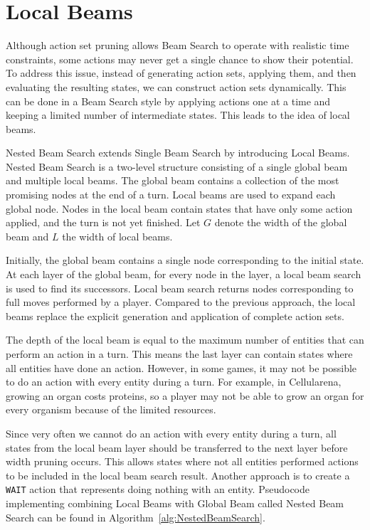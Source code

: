 \documentclass[shortabstract, mgr, english]{iithesis}
\begin{document}
\section{Local Beams}
\label{sec:LocalBeams}
Although action set pruning allows Beam Search to operate with realistic time constraints, some actions may never get a single chance to show their potential. To address this issue, instead of generating action sets, applying them, and then evaluating the resulting states, we can construct action sets dynamically. This can be done in a Beam Search style by applying actions one at a time and keeping a limited number of intermediate states. This leads to the idea of local beams.

Nested Beam Search extends Single Beam Search by introducing Local Beams. Nested Beam Search is a two-level structure consisting of a single global beam and multiple local beams. The global beam contains a collection of the most promising nodes at the end of a turn. Local beams are used to expand each global node. Nodes in the local beam contain states that have only some action applied, and the turn is not yet finished. Let $G$ denote the width of the global beam and $L$ the width of local beams. 

Initially, the global beam contains a single node corresponding to the initial state. At each layer of the global beam, for every node in the layer, a local beam search is used to find its successors. Local beam search returns nodes corresponding to full moves performed by a player.
Compared to the previous approach, the local beams replace the explicit generation and application of complete action sets. 

The depth of the local beam is equal to the maximum number of entities that can perform an action in a turn. This means the last layer can contain states where all entities have done an action. However, in some games, it may not be possible to do an action with every entity during a turn. For example, in Cellularena, growing an organ costs proteins, so a player may not be able to grow an organ for every organism because of the limited resources.

Since very often we cannot do an action with every entity during a turn, all states from the local beam layer should be transferred to the next layer before width pruning occurs. This allows states where not all entities performed actions to be included in the local beam search result. Another approach is to create a \texttt{WAIT} action that represents doing nothing with an entity.
Pseudocode implementing combining Local Beams with Global Beam called Nested Beam Search can be found in Algorithm~\ref{alg:NestedBeamSearch}.
\end{document}
